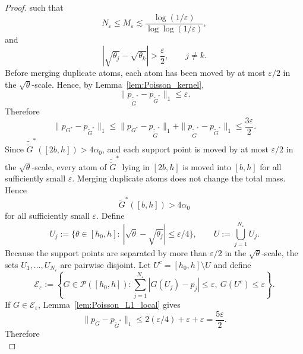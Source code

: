 \documentclass[twoside,12pt]{article}
\begin{document}
\begin{proof}
such that
\begin{displaymath}
N_\varepsilon\le M_\varepsilon\lesssim\frac{\log(1/\varepsilon)}{\log\log(1/\varepsilon)},
\end{displaymath}
and
\begin{displaymath}
|\sqrt{\theta_j}-\sqrt{\theta_k}|>\frac{\varepsilon}{2},\qquad j\neq k.
\end{displaymath}
Before merging duplicate atoms, each atom has been moved by at most $\varepsilon/2$ in the $\sqrt{\theta}$-scale. Hence, by Lemma~\ref{lem:Poisson_kernel},
\begin{displaymath}
\|p_{\tilde{\tilde G}^\ast}-p_{\tilde G^\ast}\|_1\le\varepsilon.
\end{displaymath}
Therefore
\begin{displaymath}
\|p_{G^\ast}-p_{\tilde G^\ast}\|_1\le\|p_{G^\ast}-p_{\tilde{\tilde G}^\ast}\|_1+\|p_{\tilde{\tilde G}^\ast}-p_{\tilde G^\ast}\|_1\le\frac{3\varepsilon}{2}.
\end{displaymath}
Since $\tilde{\tilde G}^\ast([2b,h])>4\alpha_0$, and each support point is moved by at most $\varepsilon/2$ in the $\sqrt{\theta}$-scale, every atom of $\tilde{\tilde G}^\ast$ lying in $[2b,h]$ is moved into $[b,h]$ for all sufficiently small $\varepsilon$. Merging duplicate atoms does not change the total mass. Hence
\begin{displaymath}
\tilde G^\ast([b,h])>4\alpha_0
\end{displaymath}
for all sufficiently small $\varepsilon$. Define
\begin{displaymath}
U_j:=\{\theta\in[h_{0},h]:\ |\sqrt{\theta}-\sqrt{\theta_j}|\le \varepsilon/4\},\qquad U:=\bigcup_{j=1}^{N_\varepsilon}U_j.
\end{displaymath}
Because the support points are separated by more than $\varepsilon/2$ in the $\sqrt{\theta}$-scale, the sets $U_1,\dots,U_{N_\varepsilon}$ are pairwise disjoint. Let
$U^c=[h_{0},h]\setminus U$ and define
\begin{displaymath}
\mathcal E_\varepsilon:=\left\{G\in\mathcal P([h_{0},h]):\sum_{j=1}^{N_\varepsilon}|G(U_j)-p_j|\le \varepsilon,\ G(U^c)\le \varepsilon\right\}.
\end{displaymath}
If $G\in\mathcal E_\varepsilon$, Lemma~\ref{lem:Poisson_L1_local} gives
\begin{displaymath}
\|p_G-p_{\tilde G^\ast}\|_1\le 2(\varepsilon/4)+\varepsilon+\varepsilon=\frac{5\varepsilon}{2}.
\end{displaymath}
Therefore
\begin{displaymath}

\end{displaymath}
\end{proof}
\end{document}

